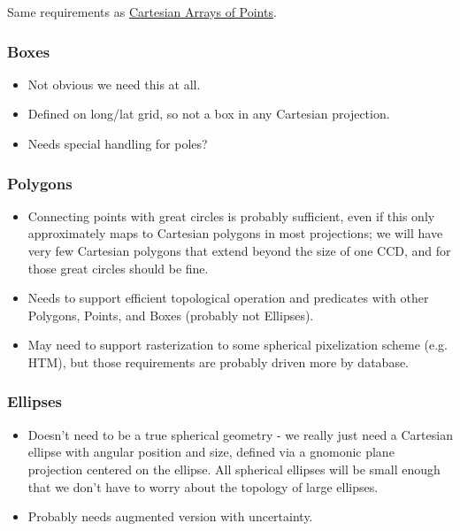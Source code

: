 Same requirements as \hyperref[sec:spCartesianPointArrays]{Cartesian Arrays of Points}.

\subsubsection{Boxes}
\label{sec:spSphericalBoxes}

\begin{itemize}
\item Not obvious we need this at all.
\item Defined on long/lat grid, so not a box in any Cartesian projection.
\item Needs special handling for poles?
\end{itemize}

\subsubsection{Polygons}
\label{sec:spSphericalPolygons}

\begin{itemize}
\item Connecting points with great circles is probably sufficient, even if this only approximately maps to Cartesian polygons in most projections; we will have very few Cartesian polygons that extend beyond the size of one CCD, and for those great circles should be fine.
\item Needs to support efficient topological operation and predicates with other Polygons, Points, and Boxes (probably not Ellipses).
\item May need to support rasterization to some spherical pixelization scheme (e.g. HTM), but those requirements are probably driven more by database.
\end{itemize}

\subsubsection{Ellipses}
\label{sec:spSphericalEllipses}

\begin{itemize}
\item Doesn't need to be a true spherical geometry - we really just need a Cartesian ellipse with angular position and size, defined via a gnomonic plane projection centered on the ellipse.  All spherical ellipses will be small enough that we don't have to worry about the topology of large ellipses.
\item Probably needs augmented version with uncertainty.
\end{itemize}

